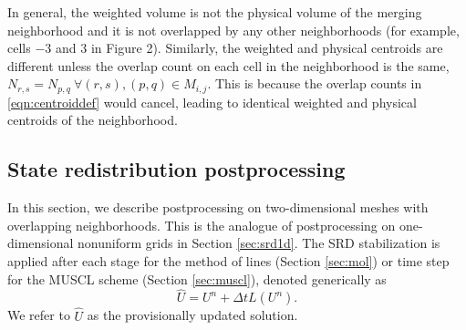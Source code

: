 In general, the weighted volume is not the physical volume of 
the merging neighborhood 
and it is not overlapped by any other neighborhoods 
(for example, cells $-3$ and $3$ in Figure 2).  Similarly, the weighted and physical 
centroids are different unless the overlap count on each cell in the neighborhood is the 
same, $N_{r,s} = N_{p,q} ~ \forall (r,s), (p,q) \in M_{i,j} $.  
This is because the overlap counts in \eqref{eqn:centroiddef} would cancel, leading to identical  weighted and physical 
centroids of the neighborhood.







\subsection{State redistribution postprocessing} \label{sec:srd_postprocessing}


In this section, we describe postprocessing on two-dimensional meshes with overlapping neighborhoods.
This is the analogue of postprocessing on one-dimensional nonuniform grids in Section \ref{sec:srd1d}.
The SRD stabilization is applied after each stage for the method of lines (Section \ref{sec:mol}) 
or time step for the MUSCL scheme (Section \ref{sec:muscl}), denoted generically as
\begin{equation} \label{eq:stage_step}
\widehat{U} = U^n + \Delta t  L(U^n).
\end{equation}
We refer to
$\widehat{U}$ as the provisionally updated solution.


